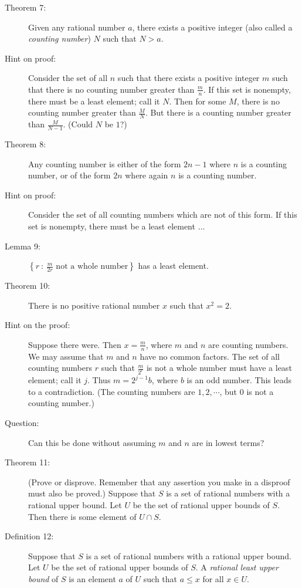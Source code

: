 \documentclass{article}
\begin{document}
\begin{description}
  \item[Theorem 7:] Given any rational number $a$, there exists a positive integer (also called a \emph{counting number}) $N$ such that $N > a$. 

  \item[Hint on proof:] Consider the set of all $n$ such that there exists a positive integer $m$ such that there is no counting number greater than $\frac{m}{n}$. If this set is nonempty, there must be a least element; call it $N$. Then for some $M$, there is no counting number greater than $\frac{M}{N}$. But there is a counting number greater than $\frac{M}{N-1}$. (Could $N$ be $1$?)

  \item[Theorem 8:] Any counting number is either of the form $2n-1$ where $n$ is a counting number, or of the form $2n$ where again $n$ is a counting number. 

  \item[Hint on proof:] Consider the set of all counting numbers which are not of this form. If this set is nonempty, there must be a least element $\ldots$

  \item[Lemma 9:] $\left\{ r\ :\ \frac{m}{2r} \text{ not a whole number} \right\}$ has a least element.

  \item[Theorem 10:] There is no positive rational number $x$ such that $x^{2} = 2$.

  \item[Hint on the proof:] Suppose there were. Then $x = \frac{m}{n}$, where $m$ and $n$ are counting numbers. We may assume that $m$ and $n$ have no common factors. The set of all counting numbers $r$ such that $\frac{m}{2^{r}}$ is not a whole number must have a least element; call it $j$. Thus $m = 2^{j-1}b$, where $b$ is an odd number. This leads to a contradiction. (The counting numbers are $1, 2, \cdots$, but $0$ is not a counting number.)

  \item[Question:] Can this be done without assuming $m$ and $n$ are in lowest terms?

  \item[Theorem 11:] (Prove or disprove. Remember that any assertion you make in a disproof must also be proved.) Suppose that $S$ is a set of rational numbers with a rational upper bound. Let $U$ be the set of rational upper bounds of $S$. Then there is some element of $U \cap S$.

  \item[Definition 12:] Suppose that $S$ is a set of rational numbers with a rational upper bound. Let $U$ be the set of rational upper bounds of $S$. A \emph{rational least upper bound} of $S$ is an element $a$ of $U$ such that $a \leq x$ for all $x \in U$.


\end{description}
\end{document}
